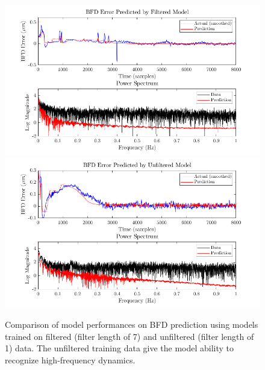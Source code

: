 \begin{figure}
    \centering
    \includegraphics[width=\textwidth]{figures/filter_len_filtered.png}
    \includegraphics[width=\textwidth]{figures/filter_len_unfiltered.png}
    \caption{Comparison of model performances on BFD prediction using models trained on filtered (filter length of 7) and unfiltered (filter length of 1) data. The unfiltered training data give the model ability to recognize high-frequency dynamics.}
    \label{fig:filter_len_time_series}
\end{figure}

